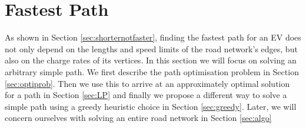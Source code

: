 \section{Fastest Path}
\label{sec:fastestpath}
As shown in Section \ref{sec:shorternotfaster}, finding the fastest path for an EV does not only depend on the lengths and speed limits of the road network's edges, but also on the charge rates of its vertices. In this section we will focus on solving an arbitrary simple path. We first describe the path optimisation problem in Section \ref{sec:optiprob}. Then we use this to arrive at an approximately optimal solution for a path in Section \ref{sec:LP} and finally we propose a different way to solve a simple path using a greedy heuristic choice in Section \ref{sec:greedy}. Later, we will concern ourselves with solving an entire road network in Section \ref{sec:algo}